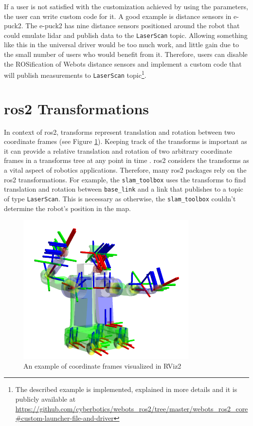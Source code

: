 If a user is not satisfied with the customization achieved by using the parameters, the user can write custom code for it.
A good example is distance sensors in e-puck2.
The e-puck2 has nine distance sensors positioned around the robot that could emulate \ac{lidar} and publish data to the \texttt{LaserScan} topic.
Allowing something like this in the universal driver would be too much work, and little gain due to the small number of users who would benefit from it.
Therefore, users can disable the ROSification of Webots distance sensors and implement a custom code that will publish measurements to \texttt{LaserScan} topic\footnote{The described example is implemented, explained in more details and it is publicly available at \url{https://github.com/cyberbotics/webots_ros2/tree/master/webots_ros2_core\#custom-launcher-file-and-driver}}.

\section{\ac{ros2} Transformations}

In context of \ac{ros2}, transforms represent translation and rotation between two coordinate frames (see Figure \ref{fig:generalization:tf2_robot}).
Keeping track of the transforms is important as it can provide a relative translation and rotation of two arbitrary coordinate frames in a transforms tree at any point in time \cite{foote_tf_2013}. 
\ac{ros2} considers the transforms as a vital aspect of robotics applications.
Therefore, many \ac{ros2} packages rely on the \ac{ros2} transformations.
For example, the \texttt{slam\_toolbox} uses the transforms to find translation and rotation between \texttt{base\_link} and a link that publishes to a topic of type \texttt{LaserScan}.
This is necessary as otherwise, the \texttt{slam\_toolbox} couldn't determine the robot's position in the map.

\begin{figure}[H]
    \centering
    \includegraphics[width=0.8\textwidth]{generalization/figures/tf2_robot.png}
    \caption{An example of coordinate frames visualized in RViz2 \cite{foote_tf_2013}}
    \label{fig:generalization:tf2_robot}
\end{figure}

